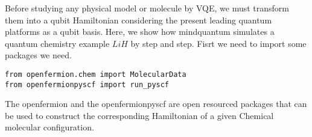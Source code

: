 Before studying any physical model or molecule by VQE, we must transform them into a qubit Hamiltonian considering the present leading quantum platforms as a qubit basis.
Here, we show how mindquantum simulates a quantum chemistry example $LiH$ by step and step. 
Fisrt we need to import some packages we need.
\begin{lstlisting}
from openfermion.chem import MolecularData
from openfermionpyscf import run_pyscf
\end{lstlisting}
The openfermion and the openfermionpyscf are open resourced packages that can be used to construct the corresponding Hamiltonian of a given Chemical molecular configuration.